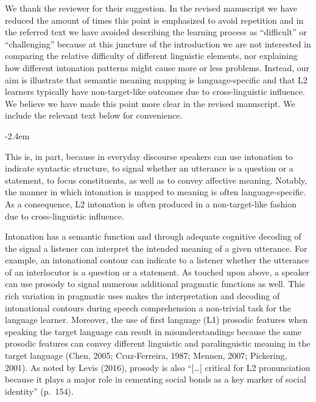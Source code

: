 \documentclass[]{article}
\renewenvironment{quote}{\begin{fquote}\advance\leftmargini -2.4em\begin{oldquote}}{\end{oldquote}\end{fquote}}
\newenvironment{fquote}
  {\def\FrameCommand{
	\fboxsep=0.6em %
	\fcolorbox{black}{white}}%
    \MakeFramed {\advance\hsize-2\width \FrameRestore}
    \begin{minipage}{\linewidth}
  }
  {\end{minipage}\endMakeFramed}
\newcommand{\TaskEstimationBox}[2]{%
\ifoptiondraft{\parbox{1.0\linewidth}{\hfill \hfill {\colorbox{#2}{\color{White} \textbf{#1}}}}}%
{}%
}
\def\Done {\TaskEstimationBox{Done}{Blue}}
\begin{document}
\Done


We thank the reviewer for their suggestion.
In the revised manuscript we have reduced the amount of times this point is emphasized to avoid repetition and in the referred text we have avoided describing the learning process as ``difficult'' or ``challenging'' because at this juncture of the introduction we are not interested in comparing the relative difficulty of different linguistic elements, nor explaining how different intonation patterns might cause more or less problems.
Instead, our aim is illustrate that semantic meaning mapping is language-specific and that L2 learners typically have non-target-like outcomes due to cross-linguistic influence.
We believe we have made this point more clear in the revised manuscript.
We include the relevant text below for convenience.

\begin{quote}
This is, in part, because in everyday discourse speakers can use intonation to indicate syntactic structure, to signal whether an utterance is a question or a statement, to focus constituents, as well as to convey affective meaning.
Notably, the manner in which intonation is mapped to meaning is often language-specific.
As a consequence, L2 intonation is often produced in a non-target-like fashion due to cross-linguistic influence.

Intonation has a semantic function and through adequate cognitive decoding of the signal a listener can interpret the intended meaning of a given utterance.
For example, an intonational contour can indicate to a listener whether the utterance of an interlocutor is a question or a statement.
As touched upon above, a speaker can use prosody to signal numerous additional pragmatic functions as well.
This rich variation in pragmatic uses makes the interpretation and decoding of intonational contours during speech comprehension a non-trivial task for the language learner.
Moreover, the use of first language (L1) prosodic features when speaking the target language can result in misunderstandings because the same prosodic features can convey different linguistic and paralinguistic meaning in the target language (Chen, 2005; Cruz-Ferreira, 1987; Mennen, 2007; Pickering, 2001).
As noted by Levis (2016), prosody is also ``{[}\ldots{]} critical for L2 pronunciation because it plays a major role in cementing social bonds as a key marker of social identity'' (p.~154).
\end{quote}
\end{document}
